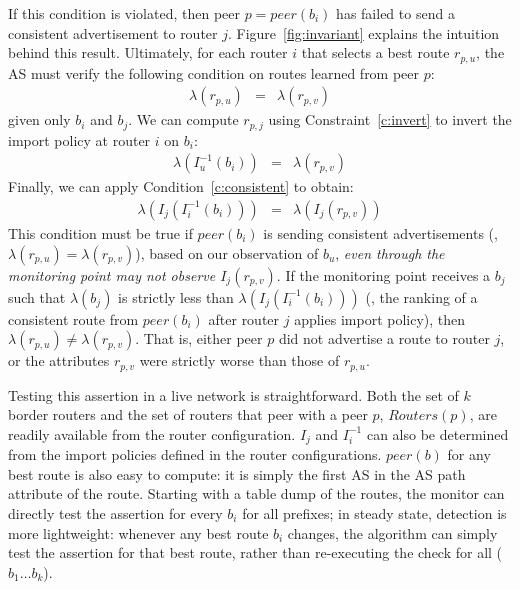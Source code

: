 If this condition is violated, then peer $p=peer(b_i)$ has failed to send a
consistent advertisement to router $j$.  Figure~\ref{fig:invariant}
explains the intuition behind this result.  Ultimately, for each router
$i$ that selects a best route $r_{p,u}$, the AS must
verify the following condition on routes learned from peer $p$:
\vspace{-0.05in}
\begin{eqnarray*}
\lambda(r_{p,u}) & = & \lambda(r_{p,v}) 
\end{eqnarray*}
given only $b_i$ and $b_j$.  We can compute $r_{p,j}$ using
Constraint~\ref{c:invert} 
to invert the import policy at router $i$ on $b_i$:
\begin{eqnarray*}
\lambda(I^{-1}_u(b_i)) & = & \lambda(r_{p,v}) 
\end{eqnarray*}
Finally, we can apply Condition~\ref{c:consistent} to obtain:
\begin{eqnarray*}
\lambda(I_j(I^{-1}_i(b_i))) & = & \lambda(I_j(r_{p,v})) 
\end{eqnarray*}
\noindent
This condition must be true if $peer(b_i)$ is sending consistent
advertisements (\ie, $\lambda(r_{p,u}) = \lambda(r_{p,v})$), based on
our observation of $b_u$, {\em even through the monitoring point may not
observe $I_j(r_{p,v})$}.  If the monitoring point receives a $b_j$ such
that $\lambda(b_j)$ is strictly less than $\lambda(I_j(I^{-1}_i(b_i)))$
(\ie, the ranking of a consistent route from $peer(b_i)$ after router
$j$ applies import policy), then $\lambda(r_{p,u}) \neq
\lambda(r_{p,v})$. That is, either peer $p$ did not advertise a route to
router $j$, or the attributes $r_{p,v}$ were strictly worse than those
of $r_{p,u}$.

Testing this assertion in a live network is straightforward.  Both the
set of $k$ border routers and the set of routers that peer with a peer
$p$, $Routers(p)$, are readily available from the router configuration.
$I_j$ and $I_i^{-1}$ can also be determined from the import policies
defined in the router configurations. $peer(b)$ for any best route is
also easy to compute: it is simply the first AS in the AS path
attribute of the route.  Starting with a table dump of the routes, the
monitor can directly test the assertion for every $b_i$ for all prefixes;
in steady state, detection is more
lightweight: whenever any best route $b_i$ changes, the algorithm can
simply test the assertion for that best route, rather than re-executing
the check for all ($b_1 \ldots b_k$).

